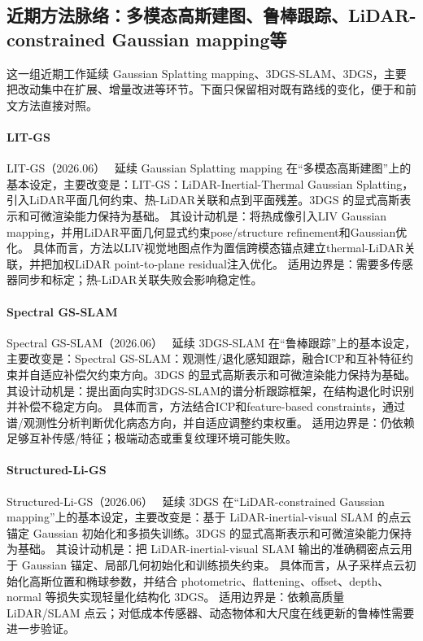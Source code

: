 
\subsection{近期方法脉络：多模态高斯建图、鲁棒跟踪、LiDAR-constrained Gaussian mapping等}

这一组近期工作延续 Gaussian Splatting mapping、3DGS-SLAM、3DGS，主要把改动集中在扩展、增量改进等环节。下面只保留相对既有路线的变化，便于和前文方法直接对照。

\paragraph{LIT-GS}
LIT-GS（2026.06）~\cite{2606_20424} 延续 Gaussian Splatting mapping 在“多模态高斯建图”上的基本设定，主要改变是：LIT-GS：LiDAR-Inertial-Thermal Gaussian Splatting，引入LiDAR平面几何约束、热-LiDAR关联和点到平面残差。3DGS 的显式高斯表示和可微渲染能力保持为基础。
其设计动机是：将热成像引入LIV Gaussian mapping，并用LiDAR平面几何显式约束pose/structure refinement和Gaussian优化。
具体而言，方法以LIV视觉地图点作为置信跨模态锚点建立thermal-LiDAR关联，并把加权LiDAR point-to-plane residual注入优化。
适用边界是：需要多传感器同步和标定；热-LiDAR关联失败会影响稳定性。

\paragraph{Spectral GS-SLAM}
Spectral GS-SLAM（2026.06）~\cite{2606_21258} 延续 3DGS-SLAM 在“鲁棒跟踪”上的基本设定，主要改变是：Spectral GS-SLAM：观测性/退化感知跟踪，融合ICP和互补特征约束并自适应补偿欠约束方向。3DGS 的显式高斯表示和可微渲染能力保持为基础。
其设计动机是：提出面向实时3DGS-SLAM的谱分析跟踪框架，在结构退化时识别并补偿不稳定方向。
具体而言，方法结合ICP和feature-based constraints，通过谱/观测性分析判断优化病态方向，并自适应调整约束权重。
适用边界是：仍依赖足够互补传感/特征；极端动态或重复纹理环境可能失败。

\paragraph{Structured-Li-GS}
Structured-Li-GS（2026.06）~\cite{2606_27509} 延续 3DGS 在“LiDAR-constrained Gaussian mapping”上的基本设定，主要改变是：基于 LiDAR-inertial-visual SLAM 的点云锚定 Gaussian 初始化和多损失训练。3DGS 的显式高斯表示和可微渲染能力保持为基础。
其设计动机是：把 LiDAR-inertial-visual SLAM 输出的准确稠密点云用于 Gaussian 锚定、局部几何初始化和训练损失约束。
具体而言，从子采样点云初始化高斯位置和椭球参数，并结合 photometric、flattening、offset、depth、normal 等损失实现轻量化结构化 3DGS。
适用边界是：依赖高质量 LiDAR/SLAM 点云；对低成本传感器、动态物体和大尺度在线更新的鲁棒性需要进一步验证。

